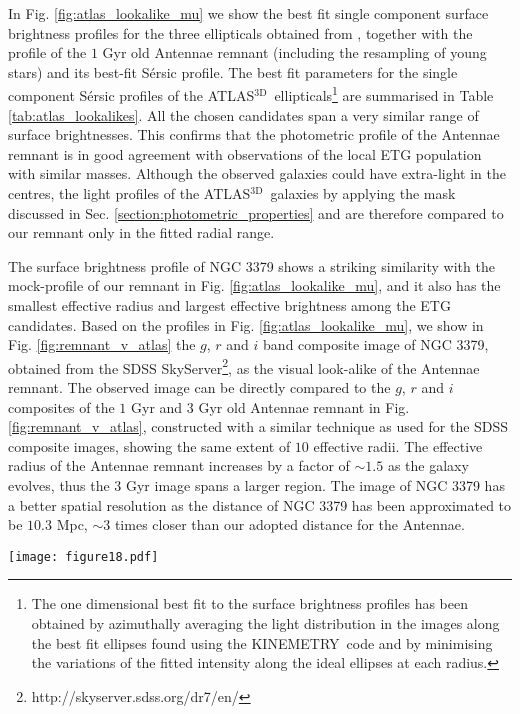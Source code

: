 \documentclass[a4paper,fleqn,usenatbib]{mnras}
\newcommand{\atlas}{\textsc{ATLAS$^\mathrm{3D}$}}
\newcommand{\kinemetry}{\textsc{KINEMETRY}}
\begin{document}
In Fig. \ref{fig:atlas_lookalike_mu} we show the best fit single component surface brightness profiles for the
three ellipticals obtained from \citet{2013MNRAS.432.1768K}, together with the profile 
of the $1$ Gyr old Antennae remnant (including the resampling of young stars) and its best-fit S\'{e}rsic profile.
The best fit parameters for the single component S\'{e}rsic profiles of the \atlas\ ellipticals\footnote{
The one dimensional best fit to the surface brightness profiles has been obtained by azimuthally averaging the light distribution in the images 
along the best fit ellipses found using the \kinemetry\ code \citep{2006MNRAS.366..787K} and by minimising the
variations of the fitted intensity along the ideal ellipses at each radius.} are summarised in 
Table \ref{tab:atlas_lookalikes}. 
All the chosen candidates span a very similar range of surface brightnesses.
This confirms that the photometric profile of the Antennae remnant is in good agreement with observations 
of the local ETG population with similar masses.  Although the observed galaxies could have extra-light in the centres, the light profiles of the \atlas\ 
galaxies by applying the mask discussed in Sec. \ref{section:photometric_properties} and are
therefore compared to our remnant only in the fitted radial range.

The surface brightness profile of 
NGC 3379 shows a striking similarity with the mock-profile of our remnant in Fig. \ref{fig:atlas_lookalike_mu}, and it
also has the smallest effective radius and largest effective brightness among the ETG candidates.
Based on the profiles in Fig. \ref{fig:atlas_lookalike_mu}, we show in Fig. \ref{fig:remnant_v_atlas} the $g$, $r$ and $i$ 
band composite image of NGC 3379, obtained from the SDSS
SkyServer\footnote{http://skyserver.sdss.org/dr7/en/}, as the visual look-alike of the Antennae remnant.
The observed image can be directly compared to the $g$, $r$ and $i$ composites of the $1$ Gyr and $3$ Gyr old Antennae remnant in Fig. 
\ref{fig:remnant_v_atlas}, constructed with a similar technique as used for the SDSS composite images, showing the same
extent of $10$ effective radii. The effective radius of the Antennae remnant
increases by a factor of $\sim1.5$ as the galaxy evolves, thus the $3$ Gyr image spans a larger region. The image of NGC 3379 has a better spatial resolution
as the distance of NGC 3379 has been approximated to be 
$10.3$ Mpc, $\sim 3$ times closer than our adopted distance for the Antennae.



\begin{figure*}
\centering
\texttt{[image: figure18.pdf]}
    \caption{Same as in Fig. \ref{fig:velocity_distribution} for the \atlas\ galaxy NGC 4494 \citep{2011MNRAS.413..813C, 2011MNRAS.414.2923K}
    showing the mean line-of-sight velocity $\langle V \rangle$ (top left), velocity dispersion $\sigma$ (top right), 
    and the higher order Gauss-Hermite coefficients $h_3$ (bottom left) and $h_4$ (bottom right).
    The contours show the distribution of flux in $1$ mag intervals and the LOSVD ranges are the same as in Fig. \ref{fig:velocity_distribution}.}
    \label{fig:atlas_lookalike_velocities}
\end{figure*}
\end{document}
